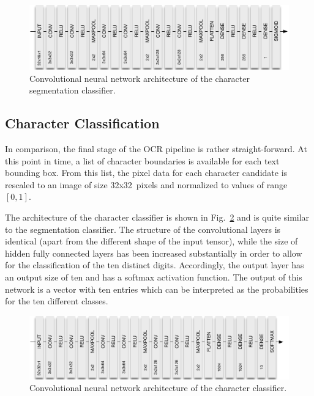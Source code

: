 \documentclass[12pt]{article}
\newcommand\figref[1]{Fig.~\ref{fig:#1}}
\begin{document}
\begin{figure}[ht]
  \centering
  \includegraphics[scale=0.75]{fig/Segmentation_CNN}
  \caption
  {
    Convolutional neural network architecture of the character segmentation classifier.
  }
  \label{fig:segmentation_cnn}
\end{figure}



\subsection{Character Classification}
In comparison, the final stage of the OCR pipeline is rather straight-forward. At this point
in time, a list of character boundaries is available for each text bounding box. From this list,
the pixel data for each character candidate is rescaled to an image of size 32x32~pixels and
normalized to values of range $[0,1]$.

The architecture of the character classifier is shown in \figref{classifier_cnn} and is
quite similar to the segmentation classifier. The structure of the convolutional layers is
identical (apart from the different shape of the input tensor), while the size of hidden
fully connected layers has been increased substantially in order to allow for the
classification of the ten distinct digits. Accordingly, the output layer has an output size
of ten and has a softmax activation function. The output of this network is a vector
with ten entries which can be interpreted as the probabilities for the ten different classes.

\begin{figure}[ht]
  \centering
  \includegraphics[scale=0.75]{fig/Classifier_CNN}
  \caption
  {
    Convolutional neural network architecture of the character classifier.
  }
  \label{fig:classifier_cnn}
\end{figure}
\end{document}
